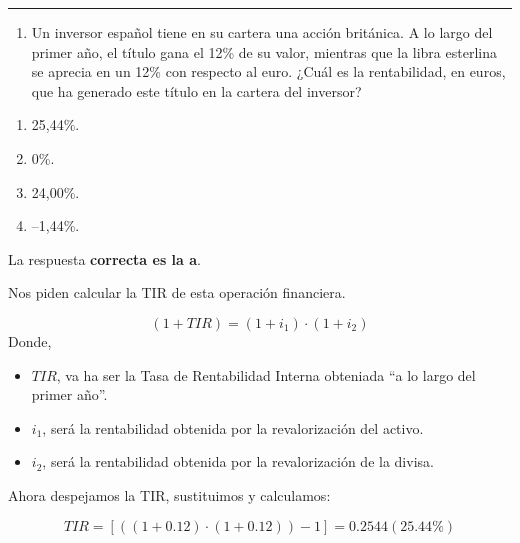 \documentclass[
  letterpaper,
  DIV=11,
  numbers=noendperiod]{scrreprt}
\providecommand{\tightlist}{%
  \setlength{\itemsep}{0pt}\setlength{\parskip}{0pt}}\usepackage{longtable,booktabs,array}
\begin{document}
\begin{center}\rule{0.5\linewidth}{0.5pt}\end{center}

\begin{enumerate}
\def\labelenumi{\arabic{enumi}.}
\setcounter{enumi}{43}
\tightlist
\item
  Un inversor español tiene en su cartera una acción británica. A lo
  largo del primer año, el título gana el 12\% de su valor, mientras que
  la libra esterlina se aprecia en un 12\% con respecto al euro. ¿Cuál
  es la rentabilidad, en euros, que ha generado este título en la
  cartera del inversor?
\end{enumerate}

\begin{enumerate}
\def\labelenumi{\alph{enumi})}
\item
  25,44\%.
\item
  0\%.
\item
  24,00\%.
\item
  --1,44\%.
\end{enumerate}

\begin{tcolorbox}[enhanced jigsaw, left=2mm, opacityback=0, colback=white, breakable, arc=.35mm, bottomrule=.15mm, rightrule=.15mm, toprule=.15mm, leftrule=.75mm, colframe=quarto-callout-tip-color-frame]
\begin{minipage}[t]{5.5mm}
\textcolor{quarto-callout-tip-color}{\faLightbulb}
\end{minipage}%
\begin{minipage}[t]{\textwidth - 5.5mm}

La respuesta \textbf{correcta es la a}.

Nos piden calcular la TIR de esta operación financiera.

\[\left(1+TIR\right)=\left(1+i_1\right)\cdot\left(1+i_2\right)\] Donde,

\begin{itemize}
\item
  \(TIR\), va ha ser la Tasa de Rentabilidad Interna obteniada ``a lo
  largo del primer año''.
\item
  \(i_1\), será la rentabilidad obtenida por la revalorización del
  activo.
\item
  \(i_2\), será la rentabilidad obtenida por la revalorización de la
  divisa.
\end{itemize}

Ahora despejamos la TIR, sustituimos y calculamos:

\[TIR=\left[((1+0.12)\cdot(1+0.12))-1\right]=0.2544(25.44\%)\]

\end{minipage}%
\end{tcolorbox}
\end{document}

